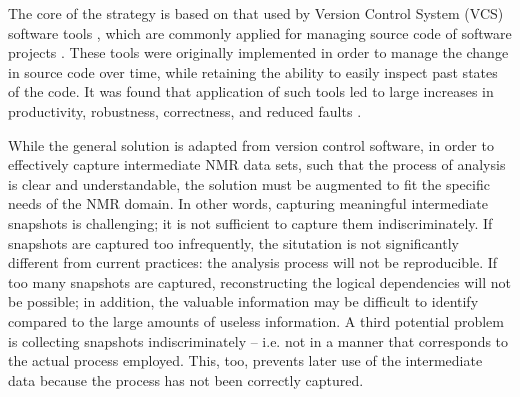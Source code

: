 The core of the strategy is based on that used by Version Control System (VCS) 
software tools \cite{vcs_concepts, hinsen2009vcs}, which are commonly 
applied for managing source code of 
software projects \cite{loeliger2012git, cvs, svn}.
These tools were originally implemented in order to manage the change in 
source code over time, while retaining the ability to easily inspect past 
states of the code.  It was found that application of such tools led to 
large increases in productivity, robustness, correctness, and reduced 
faults \cite{fischer2003vcs}.

While the general solution is adapted from version control software, in order
to effectively capture intermediate NMR data sets, such that the process of
analysis is clear and understandable, the solution must be augmented to fit
the specific needs of the NMR domain.
In other words, capturing meaningful intermediate snapshots is challenging; it 
is not sufficient to capture them indiscriminately.  If snapshots are captured 
too infrequently, the situtation is not significantly different from current 
practices: the analysis process will not be reproducible.  If too many snapshots
are captured, reconstructing the logical dependencies will not be possible;
in addition, the valuable information may be difficult to identify compared to
the large amounts of useless information.  A third potential problem is 
collecting snapshots indiscriminately -- i.e. not in a manner that corresponds
to the actual process employed.  This, too, prevents later use of the 
intermediate data because the process has not been correctly captured.

